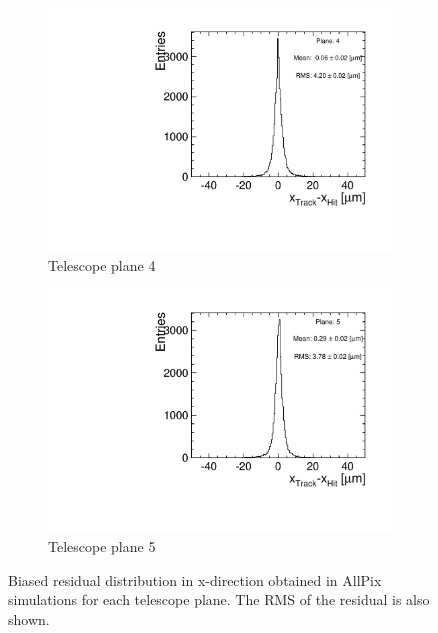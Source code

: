 \begin{figure}[htbp]
\begin{subfigure}[b]{0.3\textwidth}
    \includegraphics[width=\textwidth]{figures/Telescope/biasedResiduals/BiasedResiduals_run49_PlaneXRMS4.pdf}
    \caption{Telescope plane 4}
  \end{subfigure}\hfill
  \begin{subfigure}[b]{0.3\textwidth}
    \includegraphics[width=\textwidth]{figures/Telescope/biasedResiduals/BiasedResiduals_run49_PlaneXRMS5.pdf}
    \caption{Telescope plane 5}
  \end{subfigure}
  \caption{Biased residual distribution in x-direction obtained in
    AllPix simulations for each telescope plane. The RMS of the
    residual is also shown.}
  \label{fig:telescope_biasedResiduals_simu_X}
\end{figure}

